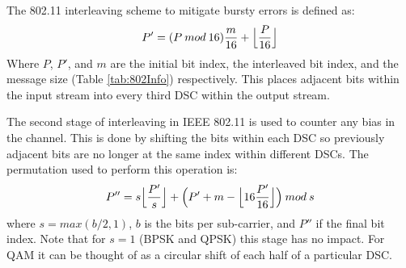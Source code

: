 \documentclass[sigconf, anonymous]{acmart}
\begin{document}



The 802.11 interleaving scheme to mitigate bursty errors is defined as: 
$$P'=(P\:mod\:16)\frac{m}{16} + \Bigl\lfloor{\frac{P}{16}}\Bigr\rfloor$$
Where $P$, $P'$, and $m$ are the initial bit index, the interleaved bit index, and the message size (Table \ref{tab:802Info}) respectively. This places adjacent bits within the input stream into every third DSC within the output stream\cite{vo2016interleaving}. 

The second stage of interleaving in IEEE 802.11 is used to counter any bias in the channel. This is done by shifting the bits within each DSC so previously adjacent bits are no longer at the same index within different DSCs. The permutation used to perform this operation is:
$$P''= s \Bigl\lfloor \frac{P'}{s} \Bigr\rfloor + \Bigl(P' + m - \Bigl\lfloor 16 \frac{P'}{16} \Bigr\rfloor \Bigr)\: mod \: s$$
where $s=max(b/2, 1)$, $b$ is the bits per sub-carrier, and $P''$ if the final bit index. Note that for $s=1$ (BPSK and QPSK) this stage has no impact. For QAM it can be thought of as a circular shift of each half of a particular DSC. 
\end{document}
